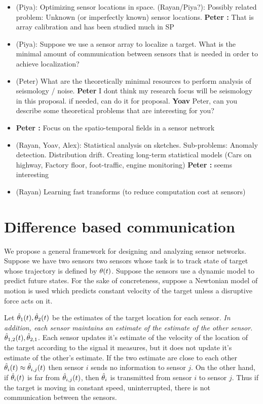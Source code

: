 \documentclass{article}
\newcommand{\comment}[3]{{\color{#1} {\bf #2 :} #3}}
\newcommand{\peter}[1]{\comment{purple}{Peter}{#1}}
\begin{document}
\begin{itemize}
    \item (Piya): Optimizing sensor locations in space. (Rayan/Piya?): Possibly related problem: Unknown (or imperfectly known) sensor locations. {\peter That is array calibration and has been studied much in SP}
    \item (Piya): Suppose we use a sensor array to localize a target. What is the minimal amount of communication between sensors that is needed in order to achieve localization?
    \item (Peter) What are the theoretically minimal resources to perform analysis of seismology / noise. {\bf Peter} I dont think my research focus will be seismology in this proposal. if needed, can do it for proposal. {\bf Yoav} Peter, can you describe some theoretical problems that are interesting for you?
    \item {\peter Focus on the spatio-temporal fields in a  sensor network}
    \item (Rayan, Yoav, Alex): Statistical analysis on sketches. Sub-problems: Anomaly detection. Distribution drift. Creating long-term statistical models (Cars on highway, Factory floor, foot-traffic, engine monitoring){\peter seems interesting}
    \item (Rayan) Learning fast transforms (to reduce computation cost at sensors) 
\end{itemize}
\fi

\section{Difference based communication}
We propose a general framework for designing and analyzing sensor networks. Suppose we have two sensors two sensors whose task is to track state of target whose trajectory is defined by $\theta(t)$. Suppose the sensors use a dynamic model to predict future states. For the sake of concreteness, suppose a Newtonian model of motion is used which predicts constant velocity of the target unless a disruptive force acts on it.

Let $\hat{\theta}_1(t),\hat{\theta}_2(t)$ be the estimates of the target location for each sensor. {\em In addition, each sensor maintains an estimate of the estimate of the other sensor.} $\hat{\theta}_{1,2}(t),\hat{\theta}_{2,1}$. Each sensor updates it's estimate of the velocity of the location of the target according to the signal it measures, but it does not update it's estimate of the other's estimate.  If the two estimate are close to each other $\hat{\theta}_i(t) \approx \hat{\theta}_{i,j}(t)$ then sensor $i$ sends no information to sensor $j$. On the other hand, if $\hat{\theta}_i(t)$ is far from $\hat{\theta}_{i,j}(t)$, then $\hat{\theta}_{i}$ is transmitted from sensor 
$i$ to sensor $j$. Thus if the target is moving in constant speed, uninterrupted, there is not communication between the sensors.
\end{document}

